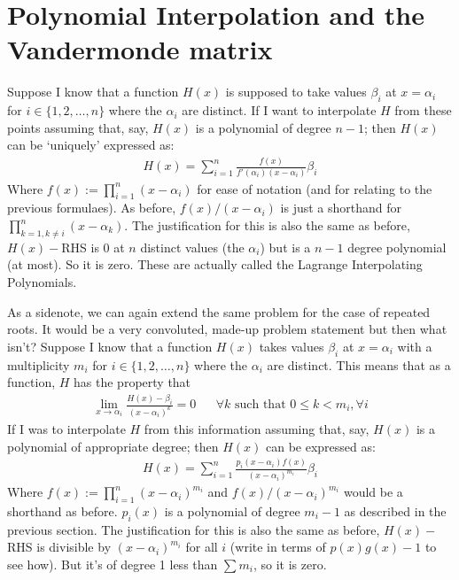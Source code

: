 \documentclass{article}
\begin{document}
\section*{Polynomial Interpolation and the Vandermonde matrix}
Suppose I know that a function $H(x)$ is supposed to take values $\beta_i$ at $x = \alpha_i$ for $i \in \{1,2,\dots,n\}$ where the $\alpha_i$ are distinct. If I want to interpolate $H$ from these points assuming that, say, $H(x)$ is a polynomial of degree $n-1$; then $H(x)$ can be `uniquely' expressed as:
\begin{align}
    H(x) = \sum_{i=1}^{n} \frac{f(x)}{f'(\alpha_i)(x-\alpha_i)} \beta_i \label{defn-H}
\end{align}
Where $f(x) := \prod_{i=1}^{n} (x-\alpha_i)$ for ease of notation (and for relating to the previous formulaes). As before, $f(x)/(x-\alpha_i)$ is just a shorthand for $\prod_{k=1, k\neq i}^{n} (x-\alpha_k)$. The justification for this is also the same as before, $H(x)-$RHS is $0$ at $n$ distinct values (the $\alpha_i$) but is a $n-1$ degree polynomial (at most). So it is zero. These are actually called the Lagrange Interpolating Polynomials.
\begin{tcolorbox}
As a sidenote, we can again extend the same problem for the case of repeated roots. It would be a very convoluted, made-up problem statement but then what isn't? Suppose I know that a function $H(x)$ takes values $\beta_i$ at $x = \alpha_i$ with a multiplicity $m_i$ for $i \in \{1,2,\dots,n\}$ where the $\alpha_i$ are distinct. This means that as a function, $H$ has the property that
\begin{align}
    \lim_{x \rightarrow \alpha_i} \frac{H(x) - \beta_i}{(x-\alpha_i)^{k}} = 0 &&\forall k \textrm{ such that } 0\leq k<m_i, \forall i
\end{align}
If I was to interpolate $H$ from this information assuming that, say, $H(x)$ is a polynomial of appropriate degree; then $H(x)$ can be expressed as:
\begin{align}
    H(x) = \sum_{i=1}^{n} \frac{p_i(x-\alpha_i) f(x)}{(x-\alpha_i)^{m_i}} \beta_i
\end{align}
Where $f(x) := \prod_{i=1}^{n} (x-\alpha_i)^{m_i}$ and $f(x)/(x-\alpha_i)^{m_i}$ would be a shorthand as before. $p_i(x)$ is a polynomial of degree $m_i-1$ as described in the previous section. The justification for this is also the same as before, $H(x)-$RHS is divisible by $(x-\alpha_i)^{m_i}$ for all $i$ (write in terms of $p(x)g(x)-1$ to see how). But it's of degree 1 less than $\sum m_i$, so it is zero.
\end{tcolorbox}
\end{document}
